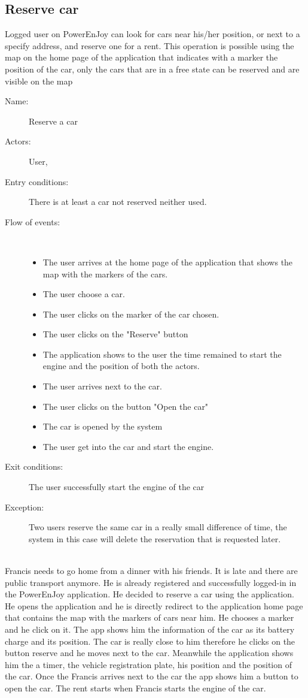 \subsection{Reserve car}
Logged user on PowerEnJoy can look for cars near his/her position, or next to a specify address, and reserve one for a rent. This operation is possible using the map on the home page of the application that indicates with a marker the position of the car, only the cars that are in a free state can be reserved and are visible on the map
\begin{description}
	\item[Name:] Reserve a car
	\item[Actors:] User,
	\item[Entry conditions:] There is at least a car not reserved neither used.
	\item[Flow of events:]  \ \\
		\begin{itemize}
			\item The user arrives at the home page of the application that shows the map with the markers of the cars.
			\item The user choose a car.
			\item The user clicks on the marker of the car chosen.
			\item The user clicks on the "Reserve" button
			\item The application shows to the user the time remained to start the engine and the position of both the actors.
			\item The user arrives next to the car.
			\item The user clicks on the button "Open the car"
			\item The car is opened by the system
			\item The user get into the car and start the engine.
		\end{itemize}
	\item[Exit conditions:] The user successfully start the engine of the car
	\item [Exception:] Two users reserve the same car in a really small difference of time, the system in this case will delete the reservation that is requested later.
\end{description}
 \ \\
Francis needs to go home from a dinner with his friends. It is late and there are public transport anymore. He is already registered and successfully logged-in in the PowerEnJoy application. He decided to reserve a car using the application. He opens the application and he is directly redirect to the application home page that contains the map with the markers of cars near him. He chooses a marker and he click on it. The app shows him the information of the car as its battery charge and its position. The car is really close to him therefore he clicks on the button reserve and he moves next to the car. Meanwhile the application shows him the  a timer, the vehicle registration plate, his position and the position of the car. Once the Francis arrives next to the car the app shows him a button to open the car. The rent starts when Francis starts the engine of the car.
